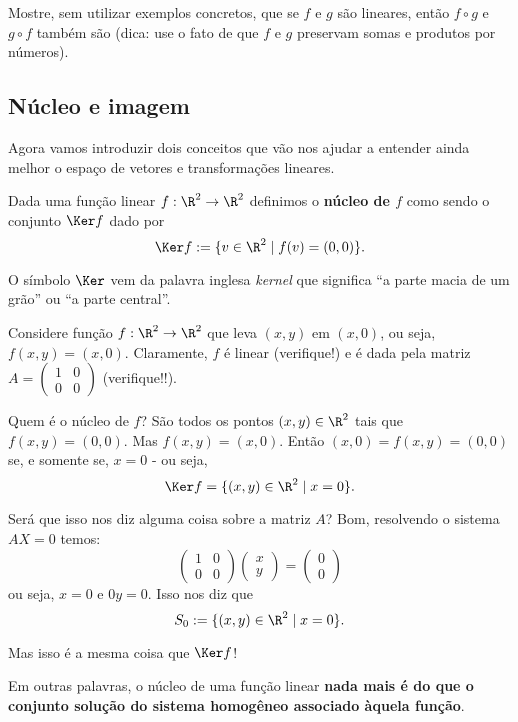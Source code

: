 \begin{exerc}
	Mostre, sem utilizar exemplos concretos, que se $f$ e $g$ são lineares, então $f\circ g$ e $g\circ f$ também são (dica: use o fato de que $f$ e $g$ preservam somas e produtos por números).
\end{exerc}

\subsection{Núcleo e imagem}

Agora vamos introduzir dois conceitos que vão nos ajudar a entender ainda melhor o espaço de vetores e transformações lineares.

\begin{df}
	Dada uma função linear $f:\R^2\to \R^2$ definimos o \textbf{núcleo de $f$} como sendo o conjunto $\Ker f$ dado por
	\[\Ker f:=\{v\in \R^2\mid f(v)=(0,0)\}.\]
\end{df}

\begin{rmk}
	O símbolo $\Ker$ vem da palavra inglesa \emph{kernel} que significa ``a parte macia de um grão'' ou ``a parte central''.
\end{rmk}

\begin{ex}
	Considere função $f:\R^2\to\R^2$ que leva $(x,y)$ em $(x,0)$, ou seja, $f(x,y)=(x,0)$. Claramente, $f$ é linear (verifique!) e é dada pela matriz $A=\begin{pmatrix}
	1&0\\0&0
	\end{pmatrix}$ (verifique!!).
	
	Quem é o núcleo de $f$? São todos os pontos $(x,y)\in \R^2$ tais que $f(x,y)=(0,0)$. Mas $f(x,y)=(x,0)$. Então $(x,0)=f(x,y)=(0,0)$ se, e somente se, $x=0$ -  ou seja,
	\[\Ker f=\{(x,y)\in \R^2\mid x=0\}.\]
	
	Será que isso nos diz alguma coisa sobre a matriz $A$? Bom, resolvendo o sistema $AX=0$ temos:
	\[\begin{pmatrix}
	1&0\\0&0
	\end{pmatrix}\begin{pmatrix}
	x\\y
	\end{pmatrix}=\begin{pmatrix}
	0\\0
	\end{pmatrix}\]ou seja, $x=0$ e $0y=0$. Isso nos diz que
	\[S_0:=\{(x,y)\in\R^2\mid x=0\}.\]
	
	Mas isso é a mesma coisa que $\Ker f$!
	
	Em outras palavras, o núcleo de uma função linear \textbf{nada mais é do que o conjunto solução do sistema homogêneo associado àquela função}.
\end{ex}

